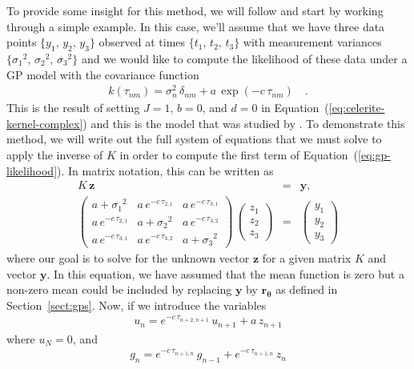 \documentclass[manuscript, letterpaper]{aastex6}
\renewcommand{\eqref}[1]{\ref{eq:#1}}
\newcommand{\Eq}[1]{Equation~(\eqref{#1})}
\newcommand{\eq}[1]{\Eq{#1}}
\newcommand{\eqlabel}[1]{\label{eq:#1}}
\newcommand{\sectionname}{Section}
\newcommand{\sectref}[1]{\ref{sect:#1}}
\newcommand{\Sect}[1]{\sectionname~\sectref{#1}}
\newcommand{\sect}[1]{\Sect{#1}}
\newcommand{\bvec}[1]{{\ensuremath{\boldsymbol{#1}}}}
\begin{document}
To provide some insight for this method, we will follow
\citet{Ambikasaran:2015} and start by working through a simple example.
In this case, we'll assume that we have three data points
$\{y_1,\,y_2,\,y_3\}$ observed at times $\{t_1,\,t_2,\,t_3\}$ with measurement
variances $\{{\sigma_1}^2,\,{\sigma_2}^2,\,{\sigma_3}^2\}$ and we would
like to compute the likelihood of these data under a GP model with the
covariance function
\begin{eqnarray}
k(\tau_{nm}) = \sigma_n^2\,\delta_{nm} + a\,\exp(-c\,\tau_{nm})\quad.
\end{eqnarray}
This is the result of setting $J=1$, $b=0$, and $d=0$ in
\eq{celerite-kernel-complex} and this is the model that was studied by
\citet{Rybicki:1995}.
To demonstrate this method, we will write out the full system of
equations that we must solve to apply the inverse of $K$ in order to compute
the first term of \eq{gp-likelihood}.
In matrix notation, this can be written as
\begin{eqnarray}\eqlabel{impl-matrix}
K\,\bvec{z} &=& \bvec{y}, \\
\begin{pmatrix}
    a+{\sigma_1}^2 & a\,e^{-c\,\tau_{2,1}} & a\,e^{-c\,\tau_{3,1}}\\
    a\,e^{-c\,\tau_{2,1}} & a+{\sigma_2}^2 & a\,e^{-c\,\tau_{3,2}}\\
    a\,e^{-c\,\tau_{3,1}} & a\,e^{-c\,\tau_{3,2}} & a+{\sigma_3}^2
\end{pmatrix}\,
\begin{pmatrix}
    z_1 \\ z_2 \\ z_3
\end{pmatrix} &=&
\begin{pmatrix}
    y_1 \\ y_2 \\ y_3
\end{pmatrix}
\end{eqnarray}
where our goal is to solve for the unknown vector \bvec{z} for a given matrix
$K$ and vector \bvec{y}.
In this equation, we have assumed that the mean function is zero but a
non-zero mean could be included by replacing \bvec{y} by
$\bvec{r}_\bvec{\theta}$ as defined in \sect{gps}.
Now, if we introduce the variables
\begin{eqnarray}\eqlabel{algo-first}
    u_n = e^{-c\,\tau_{n+2,n+1}}\,u_{n+1} + a\,z_{n+1}
\end{eqnarray}
where $u_{N} = 0$, and
\begin{eqnarray}
    g_n = e^{-c\,\tau_{n+1,n}}\,g_{n-1} + e^{-c\,\tau_{n+1,n}}\,z_{n}
\end{eqnarray}
\end{document}
